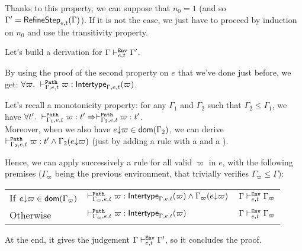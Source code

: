 \documentclass[a4paper]{article}
\theoremstyle{definition}
\begin{document}
  Thanks to this property, we can suppose that $n_0 = 1$ (and so $\Gamma' = \textsf{RefineStep}_{e,t}(\Gamma)$).
  If it is not the case, we just have to proceed by induction on $n_0$ and use the transitivity property.

  Let's build a derivation for $\Gamma \vdash^{\texttt{Env}}_{e,t} \Gamma'$.

  By using the proof of the second property on $e$ that we've done just before, we get:
  $\forall \varpi.\ \vdash^{\texttt{Path}}_{\Gamma,e,t} \varpi: \textsf{Intertype}_{\Gamma,e,t} (\varpi)$.

  Let's recall a monotonicity property: for any $\Gamma_1$ and $\Gamma_2$ such that $\Gamma_2 \leq \Gamma_1$, we have
  $\forall t'.\ \vdash^{\texttt{Path}}_{\Gamma_1,e,t} \varpi:t' \Rightarrow \vdash^{\texttt{Path}}_{\Gamma_2,e,t} \varpi:t'$.\\  
  Moreover, when we also have $e{\downarrow}\varpi \in\textsf{dom}(\Gamma_2)$, we can derive $\vdash^{\texttt{Path}}_{\Gamma_2,e,t} \varpi:t'\land\Gamma_2(e{\downarrow}\varpi)$
  (just by adding a  rule with a  and a ).

  Hence, we can apply successively a  rule for all valid $\varpi$ in $e$,
  with the following premises ($\Gamma_\varpi$ being the previous environment, that trivially verifies $\Gamma_\varpi\leq\Gamma$):\\
  
  \begin{tabular}{lll}
    If $e{\downarrow}\varpi \in\textsf{dom}(\Gamma_\varpi)$&$\vdash^{\texttt{Path}}_{\Gamma_\varpi,e,t} \varpi: \textsf{Intertype}_{\Gamma,e,t} (\varpi)\land\Gamma_\varpi(e{\downarrow}\varpi)$&$\Gamma\vdash^{\texttt{Env}}_{e,t} {\Gamma_\varpi}$\\
    Otherwise&$\vdash^{\texttt{Path}}_{\Gamma_\varpi,e,t} \varpi: \textsf{Intertype}_{\Gamma,e,t} (\varpi)$&$\Gamma\vdash^{\texttt{Env}}_{e,t} {\Gamma_\varpi}$
  \end{tabular}

  At the end, it gives the judgement $\Gamma \vdash^{\texttt{Env}}_{e,t} \Gamma'$, so it concludes the proof.
\end{document}
